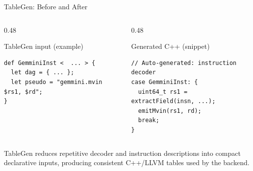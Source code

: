 \documentclass[aspectratio=169,10pt]{beamer}
\begin{document}
\begin{frame}[fragile]{TableGen: Before and After}
  \scriptsize
  \begin{columns}[T,onlytextwidth]
    \begin{column}{0.48\textwidth}
      \begin{block}{TableGen input (example)}
\begin{lstlisting}
def GemminiInst <  ... > {
  let dag = { ... };
  let pseudo = "gemmini.mvin $rs1, $rd";
}
\end{lstlisting}
      \end{block}
    \end{column}
    \begin{column}{0.48\textwidth}
      \begin{block}{Generated C++ (snippet)}
\begin{lstlisting}
// Auto-generated: instruction decoder
case GemminiInst: {
  uint64_t rs1 = extractField(insn, ...);
  emitMvin(rs1, rd);
  break;
}
\end{lstlisting}
      \end{block}
    \end{column}
  \end{columns}
  \vspace{0.3em}
  {\tiny TableGen reduces repetitive decoder and instruction descriptions into compact declarative inputs, producing consistent C++/LLVM tables used by the backend.}
\end{frame}
\end{document}
